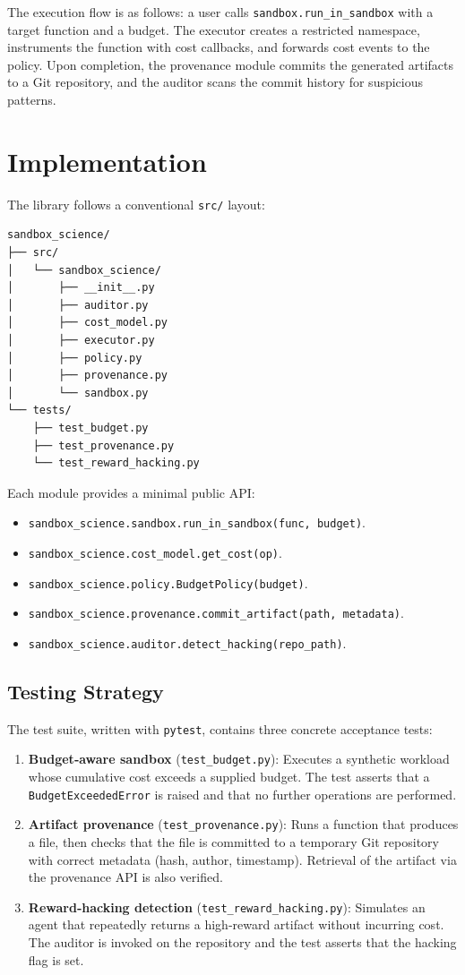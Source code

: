 \documentclass[11pt,a4paper]{article}
\begin{document}
The execution flow is as follows: a user calls \texttt{sandbox.run\_in\_sandbox} with a target function and a budget. The executor creates a restricted namespace, instruments the function with cost callbacks, and forwards cost events to the policy. Upon completion, the provenance module commits the generated artifacts to a Git repository, and the auditor scans the commit history for suspicious patterns.

\section{Implementation}
The library follows a conventional \texttt{src/} layout:

\begin{verbatim}
sandbox_science/
├── src/
│   └── sandbox_science/
│       ├── __init__.py
│       ├── auditor.py
│       ├── cost_model.py
│       ├── executor.py
│       ├── policy.py
│       ├── provenance.py
│       └── sandbox.py
└── tests/
    ├── test_budget.py
    ├── test_provenance.py
    └── test_reward_hacking.py
\end{verbatim}

Each module provides a minimal public API:

\begin{itemize}
    \item \texttt{sandbox\_science.sandbox.run\_in\_sandbox(func, budget)}.
    \item \texttt{sandbox\_science.cost\_model.get\_cost(op)}.
    \item \texttt{sandbox\_science.policy.BudgetPolicy(budget)}.
    \item \texttt{sandbox\_science.provenance.commit\_artifact(path, metadata)}.
    \item \texttt{sandbox\_science.auditor.detect\_hacking(repo\_path)}.
\end{itemize}

\subsection{Testing Strategy}
The test suite, written with \texttt{pytest}, contains three concrete acceptance tests:

\begin{enumerate}
    \item \textbf{Budget‑aware sandbox} (\texttt{test\_budget.py}): Executes a synthetic workload whose cumulative cost exceeds a supplied budget. The test asserts that a \texttt{BudgetExceededError} is raised and that no further operations are performed.
    \item \textbf{Artifact provenance} (\texttt{test\_provenance.py}): Runs a function that produces a file, then checks that the file is committed to a temporary Git repository with correct metadata (hash, author, timestamp). Retrieval of the artifact via the provenance API is also verified.
    \item \textbf{Reward‑hacking detection} (\texttt{test\_reward\_hacking.py}): Simulates an agent that repeatedly returns a high‑reward artifact without incurring cost. The auditor is invoked on the repository and the test asserts that the hacking flag is set.
\end{enumerate}
\end{document}
